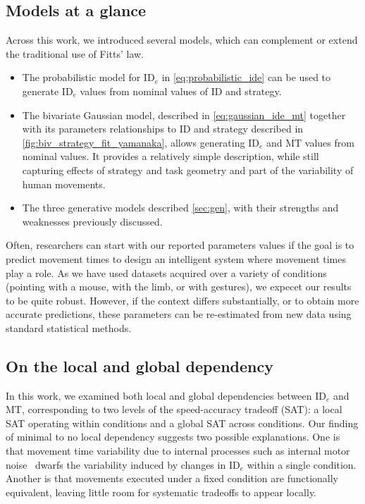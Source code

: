 \documentclass[acmlarge, manuscript,review]{acmart}
\newcommand{\mmt}{\ensuremath{\overline{\mt}}\xspace}
\newcommand{\mt}{\ensuremath{{\text{MT}}}\xspace}
\newcommand{\ide}{\ensuremath{{\text{ID}_e}}\xspace}
\begin{document}
\subsection{Models at a glance}
Across this work, we introduced several models, which can complement or extend the traditional use of Fitts' law.
\begin{itemize}
	\item The probabilistic model for \ide in \autoref{eq:probabilistic_ide} can be used to generate \ide values from nominal values of ID and strategy.
	\item The bivariate Gaussian model, described in \autoref{eq:gaussian_ide_mt} together with its parameters relationships to ID and strategy described in \autoref{fig:biv_strategy_fit_yamanaka}, allows generating \ide and \mmt values from nominal values. It provides a relatively simple description, while still capturing effects of strategy and task geometry and part of the variability of human movements.
	\item The three generative models described \autoref{sec:gen}, with their strengths and weaknesses previously discussed.
\end{itemize}
Often, researchers can start with our reported parameters values if the goal is to predict movement times \eg to design an intelligent system where movement times play a role. As we have used datasets acquired over a variety of conditions (pointing with a mouse, with the limb, or with gestures), we expecet our results to be quite robust. However, if the context differs substantially, or to obtain more accurate predictions, these parameters can be re-estimated from new data using standard statistical methods.

\subsection{On the local and global dependency}
In this work, we examined both local and global dependencies between \ide and MT, corresponding to two levels of the speed-accuracy tradeoff (SAT): a local SAT operating within conditions and a global SAT across conditions. Our finding of minimal to no local dependency suggests two possible explanations. One is that movement time variability due to internal processes such as internal motor noise~\cite{vanbeers2004,faisal2008} dwarfs the variability induced by changes in \ide within a single condition. Another is that movements executed under a fixed condition are functionally equivalent, leaving little room for systematic tradeoffs to appear locally.
\end{document}
